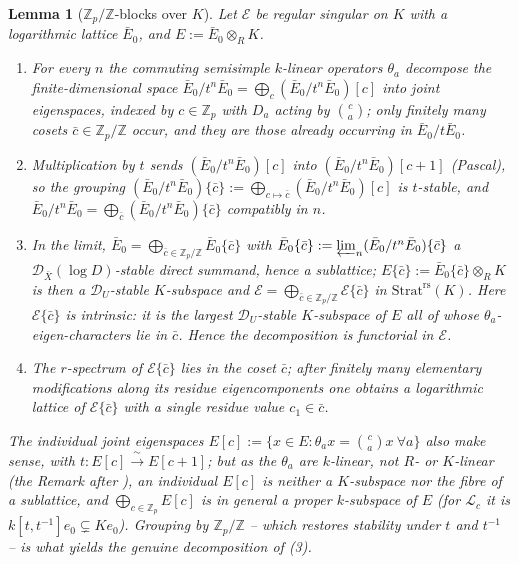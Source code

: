 \documentclass[11pt,reqno]{amsart}
\newcommand{\Zp}{\mathbb{Z}_p}
\newcommand{\ZZ}{\mathbb{Z}}
\newcommand{\cD}{\mathcal{D}}
\newcommand{\cE}{\mathcal{E}}
\newcommand{\cL}{\mathcal{L}}
\newcommand{\Strat}{\mathrm{Strat}}
\newcommand{\rs}{\mathrm{rs}}
\newcommand{\isoto}{\xrightarrow{\ \sim\ }}
\theoremstyle{plain}
\newtheorem{lemma}[theorem]{Lemma}
\theoremstyle{definition}
\theoremstyle{remark}
\numberwithin{equation}{section}
\begin{document}
\begin{lemma}[$\Zp/\ZZ$-blocks over $K$]\label{lem:Kblocks}
Let $\cE$ be regular singular on $K$ with a logarithmic lattice
$\bar E_0$, and $E:=\bar E_0\otimes_RK$.
\begin{enumerate}
\item For every $n$ the commuting semisimple $k$-linear operators
      $\theta_a$ decompose the finite-dimensional space
      $\bar E_0/t^n\bar E_0=\bigoplus_c(\bar E_0/t^n\bar E_0)[c]$ into
      joint eigenspaces, indexed by $c\in\Zp$ with $D_a$ acting by
      $\binom ca$; only finitely many cosets $\bar c\in\Zp/\ZZ$ occur,
      and they are those already occurring in $\bar E_0/t\bar E_0$.
\item Multiplication by $t$ sends $(\bar E_0/t^n\bar E_0)[c]$ into
      $(\bar E_0/t^n\bar E_0)[c+1]$ (Pascal), so the grouping
      $(\bar E_0/t^n\bar E_0)\{\bar c\}
       :=\bigoplus_{c\mapsto\bar c}(\bar E_0/t^n\bar E_0)[c]$ is
      $t$-stable, and
      $\bar E_0/t^n\bar E_0=\bigoplus_{\bar c}(\bar E_0/t^n\bar E_0)\{\bar c\}$
      compatibly in $n$.
\item In the limit,
      $\bar E_0=\bigoplus_{\bar c\in\Zp/\ZZ}\bar E_0\{\bar c\}$ with
      $\bar E_0\{\bar c\}:=\varprojlim_n(\bar E_0/t^n\bar E_0)\{\bar c\}$
      a $\cD_{\bar X}(\log D)$-stable direct summand, hence a sublattice;
      $E\{\bar c\}:=\bar E_0\{\bar c\}\otimes_RK$ is then a
      $\cD_U$-stable $K$-subspace and
      $\cE=\bigoplus_{\bar c\in\Zp/\ZZ}\cE\{\bar c\}$ in
      $\Strat^{\rs}(K)$.  Here $\cE\{\bar c\}$ is intrinsic: it is the
      largest $\cD_U$-stable $K$-subspace of $E$ all of whose
      $\theta_a$-eigen-characters lie in $\bar c$.  Hence the
      decomposition is functorial in $\cE$.
\item The $r$-spectrum of $\cE\{\bar c\}$ lies in the coset $\bar c$;
      after finitely many elementary modifications along its residue
      eigencomponents one obtains a logarithmic lattice of
      $\cE\{\bar c\}$ with a single residue value $c_1\in\bar c$.
\end{enumerate}
The individual joint eigenspaces $E[c]:=\{x\in E:\theta_ax=\binom cax\
\forall a\}$ also make sense, with $t\colon E[c]\isoto E[c+1]$; but as
the $\theta_a$ are $k$-linear, not $R$- or $K$-linear (the Remark after
\Cref{cor:rigidity}), an individual $E[c]$ is neither a $K$-subspace nor
the fibre of a sublattice, and $\bigoplus_{c\in\Zp}E[c]$ is in general a
\emph{proper} $k$-subspace of $E$ (for $\cL_c$ it is
$k[t,t^{-1}]e_0\subsetneq Ke_0$).  Grouping by $\Zp/\ZZ$ -- which
restores stability under $t$ and $t^{-1}$ -- is what yields the genuine
decomposition of (3).
\end{lemma}
\end{document}
